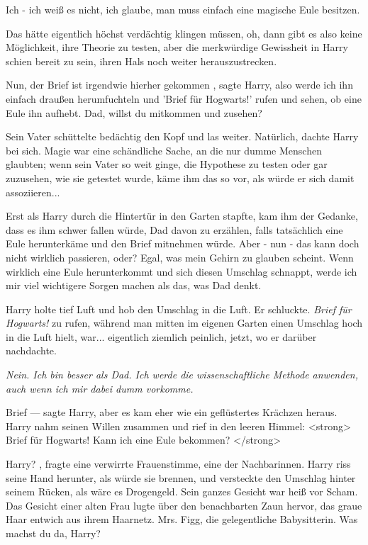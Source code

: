 \glqq Ich - ich weiß es nicht, ich glaube, man muss einfach eine magische Eule
besitzen.\grqq{}

Das hätte eigentlich höchst verdächtig klingen müssen, oh, dann gibt es also
keine Möglichkeit, ihre Theorie zu testen, aber die merkwürdige Gewissheit in
Harry schien bereit zu sein, ihren Hals noch weiter herauszustrecken.

\glqq Nun, der Brief ist irgendwie hierher gekommen\grqq{} , sagte Harry, \glqq also werde ich
ihn einfach draußen herumfuchteln und 'Brief für Hogwarts!' rufen und sehen, ob
eine Eule ihn aufhebt. Dad, willst du mitkommen und zusehen?\grqq{}

Sein Vater schüttelte bedächtig den Kopf und las weiter. Natürlich, dachte Harry
bei sich. Magie war eine schändliche Sache, an die nur dumme Menschen glaubten;
wenn sein Vater so weit ginge, die Hypothese zu testen oder gar zuzusehen, wie
sie getestet wurde, käme ihm das so vor, als würde er sich damit assoziieren...

Erst als Harry durch die Hintertür in den Garten stapfte, kam ihm der Gedanke,
dass es ihm schwer fallen würde, Dad davon zu erzählen, falls tatsächlich eine
Eule herunterkäme und den Brief mitnehmen würde. Aber - nun - das kann doch
nicht wirklich passieren, oder? Egal, was mein Gehirn zu glauben scheint. Wenn
wirklich eine Eule herunterkommt und sich diesen Umschlag schnappt, werde ich
mir viel wichtigere Sorgen machen als das, was Dad denkt.

Harry holte tief Luft und hob den Umschlag in die Luft. Er schluckte.
\emph{ \glqq Brief für Hogwarts!\grqq{}}
zu rufen, während man mitten im eigenen Garten einen Umschlag hoch in die Luft
hielt, war... eigentlich ziemlich peinlich, jetzt, wo er darüber nachdachte.

\emph{Nein. Ich bin besser als Dad. Ich werde die wissenschaftliche Methode anwenden, auch wenn ich mir dabei dumm vorkomme.}

\glqq Brief ---\grqq{} sagte Harry, aber es kam eher wie ein geflüstertes Krächzen
heraus. Harry nahm seinen Willen zusammen und rief in den leeren Himmel:
<strong> \glqq Brief für Hogwarts! Kann ich eine Eule bekommen? \glqq </strong>

\glqq Harry?\grqq{} , fragte eine verwirrte Frauenstimme, eine der Nachbarinnen. Harry riss
seine Hand herunter, als würde sie brennen, und versteckte den Umschlag hinter
seinem Rücken, als wäre es Drogengeld. Sein ganzes Gesicht war heiß vor Scham.
Das Gesicht einer alten Frau lugte über den benachbarten Zaun hervor, das graue
Haar entwich aus ihrem Haarnetz. Mrs. Figg, die gelegentliche Babysitterin. \glqq Was
machst du da, Harry?\grqq{}

